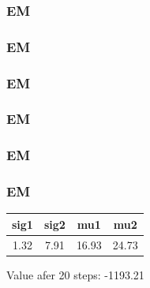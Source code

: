 \documentclass[xcolor={usenames,dvipsnames}, 
	hyperref={
	colorlinks=true, 						%
	linkcolor=black, 						%
	urlcolor=black,							%
	citecolor=black,						%
	pdfpagelabels=false,
	},
	ignorenonframetext,			%
	compress					%
]{beamer}
\begin{document}
\begin{frame}
   \frametitle{EM}


\end{frame}

\begin{frame}
   \frametitle{EM}

\end{frame}

\begin{frame}
   \frametitle{EM}

\end{frame}

\begin{frame}
   \frametitle{EM}

\end{frame}

\begin{frame}
   \frametitle{EM}

\end{frame}

\begin{frame}
   \frametitle{EM}
\begin{center}
  \begin{tabular}{ c | c | c | c }
    sig1 & sig2 & mu1 & mu2 \\ 
    \hline
    1.32 & 7.91 & 16.93 & 24.73 \\
  \end{tabular}
\end{center}
Value afer 20 steps: -1193.21
\end{frame}
\end{document}

